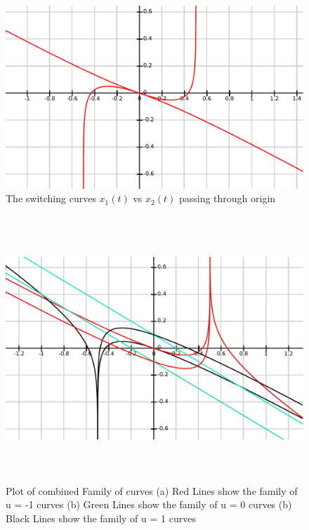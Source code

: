\begin{enumerate}
    \begin{figure}[h!]
      \includegraphics[width=\linewidth]{pic2.pdf}
      \caption{The switching curves $x_1(t)$ vs $x_2(t)$ passing through origin}
      \label{fig1} 
    \end{figure}
      \begin{figure}[h!]
      \includegraphics[width=\textwidth, height = 10cm, keepaspectratio= true]{pic1.pdf}
      \captionsetup{singlelinecheck=off}
      \caption{Plot of combined Family of curves (a) Red Lines show the family of u = -1 curves (b) Green Lines show the family of
u = 0 curves (b) Black Lines show the family of u = 1 curves }
      \label{fig2} 
    \end{figure}
     \begin{figure}[h!]

\end{figure}
\end{enumerate}
